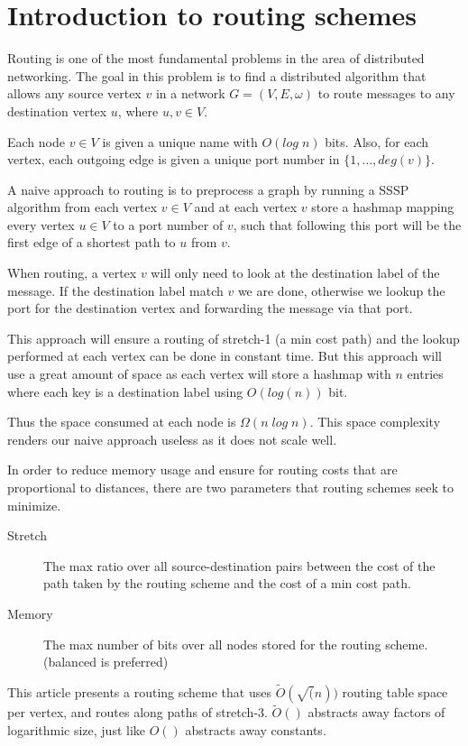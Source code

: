\chapter{Introduction to routing schemes}

Routing is one of the most fundamental problems in the area of distributed
networking. The goal in this problem is to find a distributed algorithm that
allows any source vertex $v$ in a network $G=(V,E,\omega)$ to route messages
to any destination vertex $u$, where $u, v\in V$.

Each node $v \in V$ is given a unique name with $O(log\; n)$ bits. Also,
for each vertex, each outgoing edge is given a unique port number in
$\{1,\dots,deg(v)\}$.



A naive approach to routing is to preprocess a graph by running a SSSP %
algorithm from each vertex $v \in V$ and at each vertex $v$ store a hashmap
mapping every vertex $u\in V$ to a port number of $v$, such that following this port will be the first edge of a shortest path to $u$ from $v$.

When routing, a vertex $v$ will only need to look at the destination label
of the message. If the destination label match $v$ we are done, otherwise we 
lookup the port for the destination vertex and forwarding the message via that port.

This approach will ensure a routing of stretch-1 (a min cost path) and the lookup performed at
each vertex can be done in constant time. But this approach will use a great amount of 
space as each vertex will store a hashmap with $n$ entries where each key is a
destination label using $O(log(n))$ bit.

Thus the space consumed at each node is $\Omega (n\; log\; n)$. This space
complexity renders our naive approach useless as it does not scale well.

In order to reduce memory usage and ensure for routing costs that are proportional
to distances, there are two parameters that routing schemes seek to minimize.
\begin{description}
  \item[Stretch] The max ratio over all source-destination pairs between the
      cost of the path taken by the routing scheme and the cost of a min
      cost path.
  \item[Memory] The max number of bits over all nodes stored for the routing
      scheme. (balanced is preferred)
\end{description}
This article presents a routing scheme that uses $\tilde{O}(\sqrt(n))$
routing table space per vertex, and routes along paths of stretch-3. $\tilde{O}()$ abstracts away factors of logarithmic size, just like $O()$ abstracts away constants.

